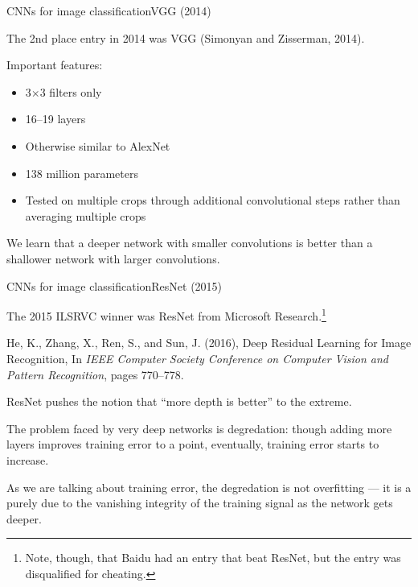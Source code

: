 \documentclass{beamer}
\begin{document}
\begin{frame}{CNNs for image classification}{VGG (2014)}

  The 2nd place entry in 2014 was VGG (Simonyan and Zisserman, 2014).

  \medskip

  Important features:
  \begin{itemize}
  \item 3$\times$3 filters only
  \item 16--19 layers
  \item Otherwise similar to AlexNet
  \item 138 million parameters
  \item Tested on multiple crops through additional convolutional steps
    rather than averaging multiple crops
  \end{itemize}

  \medskip

  We learn that a deeper network with smaller convolutions is better
  than a shallower network with larger convolutions.

\end{frame}


\begin{frame}{CNNs for image classification}{ResNet (2015)}

  The 2015 ILSRVC winner was \alert{ResNet} from Microsoft
  Research.\footnote{Note, though, that Baidu had an entry that beat ResNet,
  but the entry was disqualified for cheating.}

  \medskip

  He, K., Zhang, X., Ren, S., and Sun, J. (2016), Deep Residual
  Learning for Image Recognition, In \textit{IEEE Computer Society
    Conference on Computer Vision and Pattern Recognition}, pages
  770--778.

  \medskip

  ResNet pushes the notion that ``more depth is better'' to the extreme.

  \medskip

  The problem faced by very deep networks is \alert{degredation}:
  though adding more layers improves training error to a point,
  eventually, training error starts to \alert{increase}.

  \medskip

  As we are talking about training error, the degredation is
  \alert{not overfitting} --- it is a purely due to the vanishing
  integrity of the training signal as the network gets deeper.

\end{frame}
\end{document}
